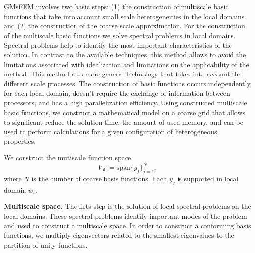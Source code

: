 \documentclass[runningheads]{llncs}
\begin{document}
GMsFEM  involves two basic steps: (1) the construction of multiscale basic functions that take into account small scale heterogeneities in the local domains and (2) the construction of the coarse scale approximation. 
For the construction of the multiscale basic functions we solve spectral problems in local domains.
Spectral problems help to identify the most important characteristics of the solution. 
In contrast to the available techniques, this method allows to avoid the limitations associated with idealization and limitations on the applicability of the method.
This method also more general technology that takes into account the different scale processes.
The construction of basic functions occurs independently for each local domain, doesn't require the exchange of information between processors, and  has a high parallelization efficiency.
Using constructed multiscale basic functions, we construct a mathematical model on a coarse grid that allows to significant reduce the solution time, the amount of used memory, and can be used to perform calculations for a given configuration of  heterogeneous properties.

We construct the mutiscale function space
\[
{V}_{\text{off}} = \mbox{span} \{ y_j \}_{j=1}^{N},
\]
where $N$ is the number of coarse basis functions.
Each $y_j$ is supported in local domain $w_i$.

\textbf{Multiscale space.}
The firts step is the solution of local spectral problems on the local domains. These spectral problems identify important modes of the problem and used to construct a multiscale space. In order to construct a conforming basis functions, we multiply eigenvectors related to the smallest eigenvalues to the partition of unity functions.
 
\end{document}
